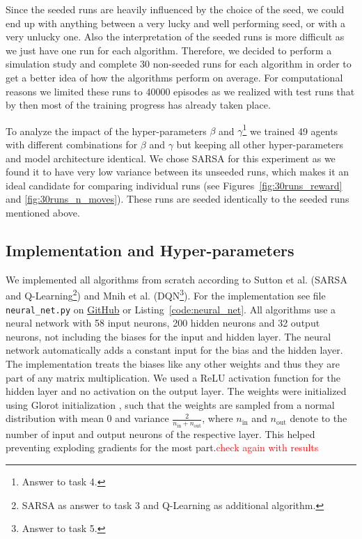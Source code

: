 \documentclass[conference]{IEEEtran}
\begin{document}
Since the seeded runs are heavily influenced by the choice of the seed, we could end up with anything between a very lucky and well performing seed, or with a very unlucky one. Also the interpretation of the seeded runs is more difficult as we just have one run for each algorithm. Therefore, we decided to perform a simulation study and complete 30 non-seeded runs for each algorithm in order to get a better idea of how the algorithms perform on average. For computational reasons we limited these runs to 40000 episodes as we realized with test runs that by then most of the training progress has already taken place.

To analyze the impact of the hyper-parameters $\beta$ and $\gamma$\footnote{Answer to task 4.} we trained 49 agents with different combinations for $\beta$ and $\gamma$ but keeping all other hyper-parameters and model architecture identical. We chose SARSA for this experiment as we found it to have very low variance between its unseeded runs, which makes it an ideal candidate for comparing individual runs (see Figures~\ref{fig:30runs_reward} and \ref{fig:30runs_n_moves}). These runs are seeded identically to the seeded runs mentioned above.




\subsection{Implementation and Hyper-parameters}\label{sec:implementation_hyper-parameters}



We implemented all algorithms from scratch according to Sutton et al. \cite{sutton2018} (SARSA and Q-Learning\footnote{SARSA as answer to task 3 and Q-Learning as additional algorithm.}) and Mnih et al. \cite{dqn2015} (DQN\footnote{Answer to task 5.}). For the implementation see file \verb"neural_net.py" on \href{https://github.com/TwoDigitsOneNumber/IntroRL_ChessAssignment}{GitHub} or Listing~\ref{code:neural_net}. All algorithms use a neural network with 58 input neurons, 200 hidden neurons and 32 output neurons, not including the biases for the input and hidden layer. The neural network automatically adds a constant input for the bias and the hidden layer. 
The implementation treats the biases like any other weights and thus they are part of any matrix multiplication. We used a ReLU activation function for the hidden layer and no activation on the output layer.
The weights were initialized using Glorot initialization \cite{glorot2010}, such that the weights are sampled from a normal distribution with mean 0 and variance $\frac{2}{n_{\text{in}} + n_{\text{out}}}$, where $n_\text{in}$ and $n_\text{out}$ denote to the number of input and output neurons of the respective layer. This helped preventing exploding gradients for the most part.\textcolor{red}{check again with results}
\end{document}
